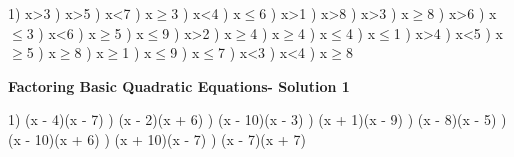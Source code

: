 \documentclass{article}%
\begin{document}
1) x>3%
) x>5%
) x<7%
) x$\geq$3%
) x<4%
) x$\leq$6%
) x>1%
) x>8%
) x>3%
) x$\geq$8%
) x>6%
) x$\leq$3%
) x<6%
) x$\geq$5%
) x$\leq$9%
) x>2%
) x$\geq$4%
) x$\geq$4%
) x$\leq$4%
) x$\leq$1%
) x>4%
) x<5%
) x$\geq$5%
) x$\geq$8%
) x$\geq$1%
) x$\leq$9%
) x$\leq$7%
) x<3%
) x<4%
) x$\geq$8%
\newline%
\newpage%
\large%
\begin{center}%
\textbf{Factoring Basic Quadratic Equations- Solution 1}%
\newline%
\end{center} \normalsize%
1) (x - 4)(x - 7)%
) (x - 2)(x + 6)%
) (x - 10)(x - 3)%
) (x + 1)(x - 9)%
) (x - 8)(x - 5)%
) (x - 10)(x + 6)%
) (x + 10)(x - 7)%
) (x - 7)(x + 7)%
\newline%
\end{document}
